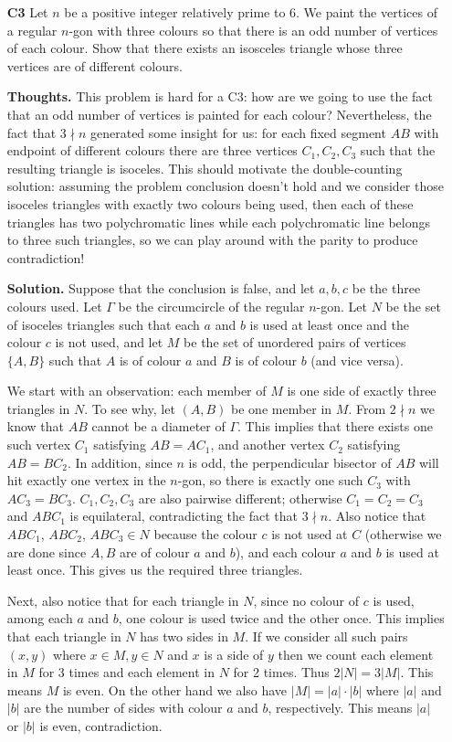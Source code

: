 \documentclass[11pt,a4paper]{article}
\begin{document}
\begin{itemize}
\newpage
\item[\textbf{C3}]
Let $n$ be a positive integer relatively prime to $6$. We paint the vertices of a regular $n$-gon with three colours so that there is an odd number of vertices of each colour. Show that there exists an isosceles triangle whose three vertices are of different colours.

\textbf{Thoughts.} 
This problem is hard for a C3: how are we going to use the fact that an odd number of vertices is painted for each colour? 
Nevertheless, the fact that $3\nmid n$ generated some insight for us: for each fixed segment $AB$ with endpoint of different colours there are three vertices $C_1, C_2, C_3$ such that the resulting triangle is isoceles. 
This should motivate the double-counting solution: assuming the problem conclusion doesn't hold and we consider those isoceles triangles with exactly two colours being used, then each of these triangles has two polychromatic lines while each polychromatic line belongs to three such triangles, so we can play around with the parity to produce contradiction!

\textbf{Solution.} 
Suppose that the conclusion is false, and let $a, b, c$ be the three colours used. 
Let $\Gamma$ be the circumcircle of the regular $n$-gon. 
Let $N$ be the set of isoceles triangles such that each $a$ and $b$ is used at least once and the colour $c$ is not used, 
and let $M$ be the set of unordered pairs of vertices $\{A, B\}$ such that $A$ is of colour $a$ and $B$ is of colour $b$ (and vice versa). 

We start with an observation: each member of $M$ is one side of exactly three triangles in $N$. 
To see why, let $(A,B)$ be one member in $M$. From $2\nmid n$ we know that $AB$ cannot be a diameter of $\Gamma$. 
This implies that there exists one such vertex $C_1$ satisfying $AB=AC_1$, and another vertex $C_2$ satisfying $AB=BC_2$. 
In addition, since $n$ is odd, the perpendicular bisector of $AB$ will hit exactly one vertex in the $n$-gon, 
so there is exactly one such $C_3$ with $AC_3=BC_3$. 
$C_1, C_2, C_3$ are also pairwise different; otherwise $C_1=C_2=C_3$ and $ABC_1$ is equilateral, 
contradicting the fact that $3\nmid n$. 
Also notice that $ABC_1$, $ABC_2$, $ABC_3\in N$ because the colour $c$ is not used at $C$ (otherwise we are done since $A, B$ are of colour $a$ and $b$), and each colour $a$ and $b$ is used at least once. 
This gives us the required three triangles. 

Next, also notice that for each triangle in $N$, 
since no colour of $c$ is used, among each $a$ and $b$, one colour is used twice and the other once. 
This implies that each triangle in $N$ has two sides in $M$. 
If we consider all such pairs $(x, y)$ where $x\in M, y\in N$ and $x$ is a side of $y$ then we count each element in $M$ for 3 times and each element in $N$ for 2 times. 
Thus $2|N|=3|M|$. 
This means $M$ is even. On the other hand we also have $|M|=|a|\cdot |b|$ where $|a|$ and $|b|$ are the number of sides with colour $a$ and $b$, respectively. This means $|a|$ or $|b|$ is even, contradiction. 


\end{itemize}
\end{document}
